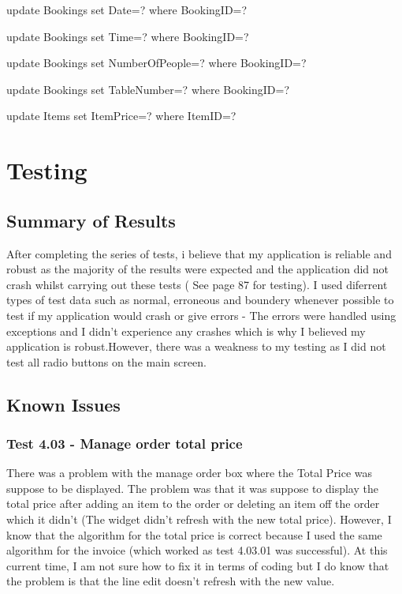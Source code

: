 \begin{sql}
update Bookings set Date=? where BookingID=?
\end{sql}

\begin{sql}
update Bookings set Time=? where BookingID=?
\end{sql}

\begin{sql}
update Bookings set NumberOfPeople=? where BookingID=?
\end{sql}

\begin{sql}
update Bookings set TableNumber=? where BookingID=?
\end{sql}

\begin{sql}
update Items set ItemPrice=? where ItemID=?
\end{sql}

\section{Testing}

\subsection{Summary of Results}
After completing the series of tests, i believe that my application is reliable and robust as the majority of the results were expected and the application did not crash whilst carrying out these tests ( See page 87 for testing). I used diferrent types of test data such as normal, erroneous and boundery whenever possible to test if my application would crash or give errors - The errors were handled using exceptions and I didn't experience any crashes which is why I believed my application is robust.However, there was a weakness to my testing as I did not test all radio buttons on the main screen.


\subsection{Known Issues}

\subsubsection{Test 4.03 - Manage order total price}
There was a problem with the manage order box where the Total Price was suppose to be displayed. The problem was that it was suppose to display the total price after adding an item to the order or deleting an item off the order which it didn't (The widget didn't refresh with the new total price). However, I know that the algorithm for the total price is correct because I used the same algorithm for the invoice (which worked as test 4.03.01 was successful). At this current time, I am not sure how to fix it in terms of coding but I do know that the problem is that the line edit doesn't refresh with the new value.


